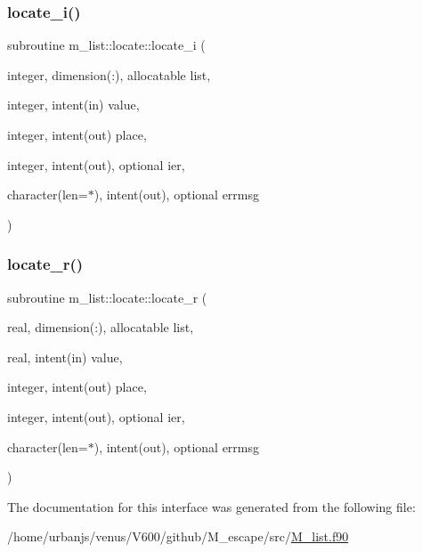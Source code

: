 \subsubsection{\texorpdfstring{locate\+\_\+i()}{locate\_i()}}
{\footnotesize\ttfamily subroutine m\+\_\+list\+::locate\+::locate\+\_\+i (\begin{DoxyParamCaption}\item[{integer, dimension(\+:), allocatable}]{list,  }\item[{integer, intent(in)}]{value,  }\item[{integer, intent(out)}]{place,  }\item[{integer, intent(out), optional}]{ier,  }\item[{character(len=$\ast$), intent(out), optional}]{errmsg }\end{DoxyParamCaption})\hspace{0.3cm}{\ttfamily [private]}}

\mbox{\label{interfacem__list_1_1locate_a23014daaa8ddc33946750235c976de4a}} 
\subsubsection{\texorpdfstring{locate\+\_\+r()}{locate\_r()}}
{\footnotesize\ttfamily subroutine m\+\_\+list\+::locate\+::locate\+\_\+r (\begin{DoxyParamCaption}\item[{real, dimension(\+:), allocatable}]{list,  }\item[{real, intent(in)}]{value,  }\item[{integer, intent(out)}]{place,  }\item[{integer, intent(out), optional}]{ier,  }\item[{character(len=$\ast$), intent(out), optional}]{errmsg }\end{DoxyParamCaption})\hspace{0.3cm}{\ttfamily [private]}}



The documentation for this interface was generated from the following file\+:\begin{DoxyCompactItemize}
\item 
/home/urbanjs/venus/\+V600/github/\+M\+\_\+escape/src/\mbox{\hyperlink{M__list_8f90}{M\+\_\+list.\+f90}}\end{DoxyCompactItemize}
